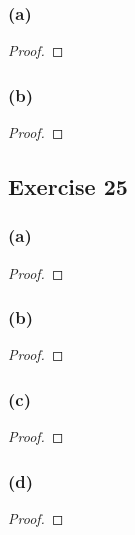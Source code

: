 \documentclass[14pt]{extarticle}
\begin{document}
\subsubsection{(a)}

\begin{proof}

\end{proof}

\subsubsection{(b)}

\begin{proof}

\end{proof}

\subsection{Exercise 25}

\subsubsection{(a)}

\begin{proof}

\end{proof}

\subsubsection{(b)}

\begin{proof}

\end{proof}

\subsubsection{(c)}

\begin{proof}

\end{proof}

\subsubsection{(d)}

\begin{proof}

\end{proof}
\end{document}
